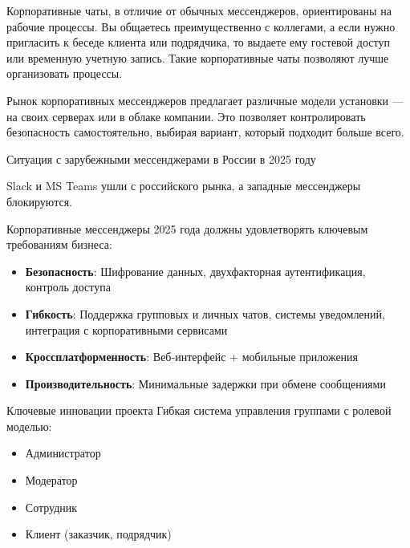 Корпоративные чаты, в отличие от обычных мессенджеров, ориентированы на рабочие процессы. Вы общаетесь преимущественно с коллегами, а если нужно пригласить к беседе клиента или подрядчика, то выдаете ему гостевой доступ или временную учетную запись. Такие корпоративные чаты позволяют лучше организовать процессы.

Рынок корпоративных мессенджеров предлагает различные модели установки — на своих серверах или в облаке компании. Это позволяет контролировать безопасность самостоятельно, выбирая вариант, который подходит больше всего.

Ситуация с зарубежными мессенджерами в России в 2025 году

Slack и MS Teams ушли с российского рынка, а западные мессенджеры блокируются.

Корпоративные мессенджеры 2025 года должны удовлетворять ключевым требованиям бизнеса:
\begin{itemize}
	\item \textbf{Безопасность}: Шифрование данных, двухфакторная аутентификация, контроль доступа
	\item \textbf{Гибкость}: Поддержка групповых и личных чатов, системы уведомлений, интеграция с корпоративными сервисами
	\item \textbf{Кроссплатформенность}: Веб-интерфейс + мобильные приложения
	\item \textbf{Производительность}: Минимальные задержки при обмене сообщениями
\end{itemize}

{Ключевые инновации проекта}
Гибкая система управления группами с ролевой моделью:
\begin{itemize}
	\item Администратор
	\item Модератор
	\item Сотрудник
	\item Клиент (заказчик, подрядчик)
\end{itemize}
		

